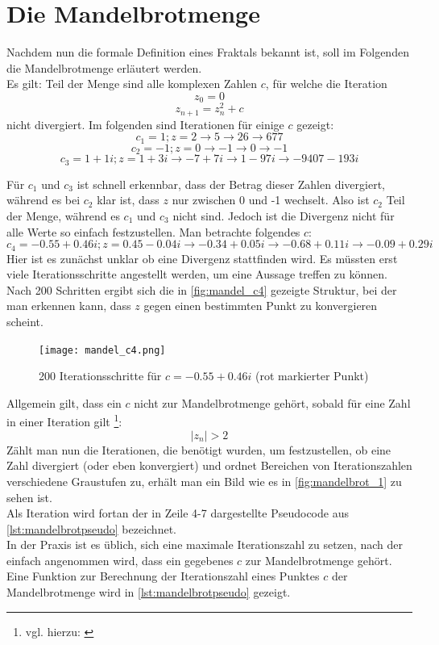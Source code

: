 \documentclass[a4paper,12pt,onesided]{report}
\begin{document}
\section{Die Mandelbrotmenge}
\label{sec:mandelbrotmath}
Nachdem nun die formale Definition eines Fraktals bekannt ist, soll im Folgenden die Mandelbrotmenge erläutert werden.\\
Es gilt: Teil der Menge sind alle komplexen Zahlen $c$, für welche die Iteration
\[z_0=0\]
\[z_{n+1}=z_n^2 + c\]
nicht divergiert.
Im folgenden sind Iterationen für einige $c$ gezeigt:
\[c_1=1 ; z=2 \rightarrow 5 \rightarrow 26 \rightarrow 677\]
\[c_2=-1 ; z=0 \rightarrow -1 \rightarrow 0 \rightarrow -1\]
\[c_3=1+1i ; z=1+3i \rightarrow -7+7i \rightarrow 1-97i \rightarrow -9407-193i\]

Für $c_1$ und $c_3$ ist schnell erkennbar, dass der Betrag dieser Zahlen divergiert, während es bei $c_2$ klar ist, dass $z$ nur zwischen 0 und -1 wechselt. Also ist $c_2$ Teil der Menge, während es $c_1$ und $c_3$ nicht sind. Jedoch ist die Divergenz nicht für alle Werte so einfach festzustellen. Man betrachte folgendes $c$:
\[c_4=-0.55 + 0.46i ; z=0.45 - 0.04i \rightarrow -0.34 + 0.05i \rightarrow -0.68 + 0.11i \rightarrow -0.09 + 0.29i\]
Hier ist es zunächst unklar ob eine Divergenz stattfinden wird.
Es müssten erst viele Iterationsschritte angestellt werden, um eine Aussage treffen zu können. Nach 200 Schritten ergibt sich die in \autoref{fig:mandel_c4} gezeigte Struktur, bei der man erkennen kann, dass $z$ gegen einen bestimmten Punkt zu konvergieren  scheint.

\begin{figure}[H]
	\centering
	\texttt{[image: mandel\_c4.png]}
	\caption{200 Iterationsschritte für $c = -0.55 + 0.46i$ (rot markierter Punkt)}
	\label{fig:mandel_c4}
\end{figure}

Allgemein gilt, dass ein $c$ nicht zur Mandelbrotmenge gehört, sobald für eine Zahl in einer Iteration gilt \footnote{vgl. hierzu: \cite{mbrotg2}}:
\[|z_n|>2\]
Zählt man nun die Iterationen, die benötigt wurden, um festzustellen, ob eine Zahl divergiert (oder eben konvergiert) und ordnet Bereichen von Iterationszahlen verschiedene Graustufen zu, erhält man ein Bild wie es in \autoref{fig:mandelbrot_1} zu sehen ist.\\
Als Iteration wird fortan der in Zeile 4-7 dargestellte Pseudocode aus \autoref{lst:mandelbrotpseudo} bezeichnet.\\
In der Praxis ist es üblich, sich eine maximale Iterationszahl zu setzen, nach der einfach angenommen wird, dass ein gegebenes $c$ zur Mandelbrotmenge gehört.\\
Eine Funktion zur Berechnung der Iterationszahl eines Punktes $c$ der Mandelbrotmenge wird in \autoref{lst:mandelbrotpseudo} gezeigt.
\end{document}
